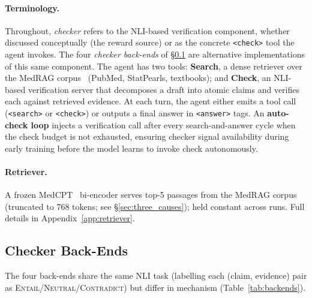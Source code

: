 \documentclass[11pt]{article}
\begin{document}
\paragraph{Terminology.} Throughout, \emph{checker} 
refers to the NLI-based verification component, 
whether discussed conceptually (the reward source) 
or as the concrete \texttt{<check>} tool the agent 
invokes. The four \emph{checker back-ends} of 
\S\ref{sec:verifiers} are alternative implementations 
of this same component.
The agent has two tools: \textbf{Search}, a dense 
retriever over the MedRAG 
corpus~\citep{xiong2024benchmarking} (PubMed, 
StatPearls, textbooks); and \textbf{Check}, an 
NLI-based verification server that decomposes a 
draft into atomic claims and verifies each against 
retrieved evidence.
At each turn, the agent either emits a tool call (\texttt{<search>} or \texttt{<check>}) or outputs a final answer in \texttt{<answer>} tags. An \textbf{auto-check loop} injects a verification call after every search-and-answer cycle when the check budget is not exhausted, ensuring checker signal availability during early training before the model learns to invoke check autonomously.

\paragraph{Retriever.}
A frozen MedCPT~\citep{jin2023medcpt} bi-encoder
serves top-5 passages from the MedRAG
corpus~\citep{xiong2024benchmarking} (truncated to
768 tokens; see \S\ref{sec:three_causes}); held
constant across runs. Full details in
Appendix~\ref{app:retriever}.
\subsection{Checker Back-Ends}
\label{sec:verifiers}

The four back-ends share the same NLI task 
(labelling each (claim, evidence) pair as 
\textsc{Entail}/\textsc{Neutral}/\textsc{Contradict}) 
but differ in mechanism (Table~\ref{tab:backends}).
\end{document}
